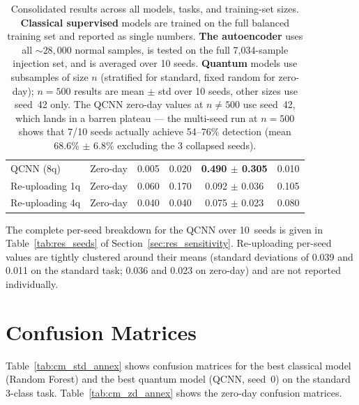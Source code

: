 \documentclass[twoside,openany,a4paper,11pt,english]{report}
\begin{document}
\begin{table}[ht]
\begin{tabular}{llcccc}
    \midrule
    QCNN (8q)       & Zero-day  & 0.005 & 0.020 & \textbf{0.490 $\pm$ 0.305} & 0.010 \\
    Re-uploading 1q & Zero-day  & 0.060 & 0.170 & 0.092 $\pm$ 0.036 & 0.105 \\
    Re-uploading 4q & Zero-day  & 0.040 & 0.040 & 0.075 $\pm$ 0.023 & 0.080 \\
    \bottomrule
\end{tabular}
\caption{Consolidated results across all models, tasks, and training-set sizes. \textbf{Classical supervised} models are trained on the full balanced training set and reported as single numbers. \textbf{The autoencoder} uses all ${\sim}28{,}000$ normal samples, is tested on the full 7,034-sample injection set, and is averaged over 10 seeds. \textbf{Quantum} models use subsamples of size $n$ (stratified for standard, fixed random for zero-day); $n=500$ results are mean $\pm$ std over 10 seeds, other sizes use seed~42 only. The QCNN zero-day values at $n\neq 500$ use seed~42, which lands in a barren plateau --- the multi-seed run at $n=500$ shows that 7/10 seeds actually achieve 54--76\% detection (mean 68.6\% $\pm$ 6.8\% excluding the 3 collapsed seeds).}
\label{tab:full_results}
\end{table}

The complete per-seed breakdown for the QCNN over 10~seeds is given in Table~\ref{tab:res_seeds} of Section~\ref{sec:res_sensitivity}. Re-uploading per-seed values are tightly clustered around their means (standard deviations of 0.039 and 0.011 on the standard task; 0.036 and 0.023 on zero-day) and are not reported individually.


\section{Confusion Matrices}
\label{app:confusion}

Table~\ref{tab:cm_std_annex} shows confusion matrices for the best classical model (Random Forest) and the best quantum model (QCNN, seed~0) on the standard 3-class task. Table~\ref{tab:cm_zd_annex} shows the zero-day confusion matrices.
\end{document}
